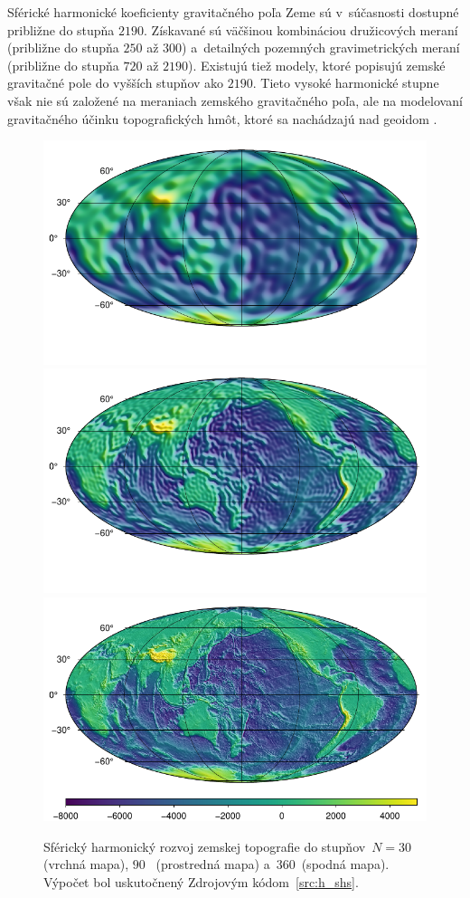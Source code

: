 \documentclass[a4paper,12pt]{book}
\begin{document}
Sférické harmonické koeficienty gravitačného poľa Zeme sú v~súčasnosti dostupné
približne do stupňa $2190$.  Získavané sú väčšinou kombináciou družicových
meraní (približne do stupňa $250$ až $300$) a~detailných pozemných
gravimetrických meraní (približne do stupňa $720$ až $2190$).  Existujú tiež 
modely, ktoré popisujú zemské gravitačné pole do vyšších stupňov ako $2190$.  
Tieto vysoké harmonické stupne však nie sú založené na meraniach zemského 
gravitačného poľa, ale na modelovaní gravitačného účinku topografických hmôt, 
ktoré sa nachádzajú nad geoidom \parencite{Ince2020}.

\begin{figure}
\centering
\includegraphics{./fig-h-shs-nmax30.pdf}
\includegraphics{./fig-h-shs-nmax90.pdf}
\includegraphics{./fig-h-shs-nmax360.pdf}
\caption{Sférický harmonický rozvoj zemskej topografie do stupňov~$N = 30$
(vrchná mapa), $90$~ (prostredná mapa) a~$360$~(spodná mapa).  Výpočet bol
uskutočnený Zdrojovým kódom~\ref{src:h_shs}.}
\label{fig:shs_h}
\end{figure}
\end{document}
